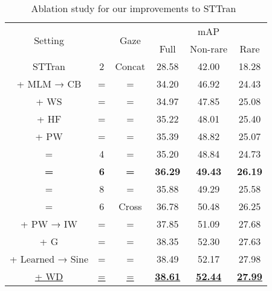 \documentclass[times,twocolumn,final,authoryear]{elsarticle}
\begin{document}
\begin{table}
    \begin{subtable}[]{0.47\textwidth}
        \centering
        \small
        \begin{tabular}{|c|c|c|c c c|}
            \hline
            \multirow{2}{*}{Setting} & \multirow{2}{*}{} & \multirow{2}{*}{Gaze} & \multicolumn{3}{c|}{mAP} \\
            \cline{4-6}
            & & & Full & Non-rare & Rare \\
            \hhline{|=|=|=|= = =|}
            STTran & 2 & Concat & 28.58 & 42.00 & 18.28 \\
            + MLM → CB & = & = & 34.20 & 46.92 & 24.43 \\
            + WS & = & = & 34.97 & 47.85 & 25.08 \\
            + HF & = & = & 35.22 & 48.01 & 25.40\\
            + PW & = & = & 35.39 & 48.82 & 25.07 \\
            = & 4 & = & 35.20 & 48.84 & 24.73 \\
            \textbf{=} & \textbf{6} & \textbf{=} & \textbf{36.29} & \textbf{49.43} & \textbf{26.19} \\
            = & 8 & = & 35.88 & 49.29 & 25.58 \\
            \hline
            = & 6 & Cross & 36.78 & 50.48 & 26.25 \\
            + PW → IW & = & = & 37.85 & 51.09 & 27.68 \\
            + G & = & = & 38.35 & 52.30 & 27.63 \\
            + Learned → Sine & = & = & 38.49 & 52.17 & 27.98 \\
            \underline{+ WD} & \underline{=} & \underline{=} & \underline{\textbf{38.61}} & \underline{\textbf{52.44}} & \underline{\textbf{27.99}} \\
            \hline
        \end{tabular}
        \caption{Ablation study for our improvements to STTran~\citep{hoi_v2:sttran}}
        \label{table:ablation_components}
    \end{subtable}


\end{table}
\end{document}
